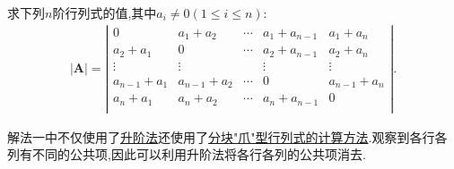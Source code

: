 \documentclass[lang=cn,newtx,10pt,scheme=chinese]{elegantbook}
\begin{document}
\begin{exercise}
    求下列$n$阶行列式的值,其中$a_i\ne 0(1\le i\le n)$:
    \begin{align*}
        |\boldsymbol{A}|=\left| \begin{matrix}
            0&		a_1+a_2&		\cdots&		a_1+a_{n-1}&		a_1+a_n\\
            a_2+a_1&		0&		\cdots&		a_2+a_{n-1}&		a_2+a_n\\
            \vdots&		\vdots&		&		\vdots&		\vdots\\
            a_{n-1}+a_1&		a_{n-1}+a_2&		\cdots&		0&		a_{n-1}+a_n\\
            a_n+a_1&		a_n+a_2&		\cdots&		a_n+a_{n-1}&		0\\
        \end{matrix} \right|.
    \end{align*}
\end{exercise}
\begin{note}
    {\color{blue}解法一}中不仅使用了\hyperlink{行列式计算:升阶法}{升阶法}还使用了\hyperref[proposition:分块"爪"型行列式]{分块"爪"型行列式的计算方法}.观察到各行各列有不同的公共项,因此可以利用升阶法将各行各列的公共项消去.
\end{note}
\end{document}
